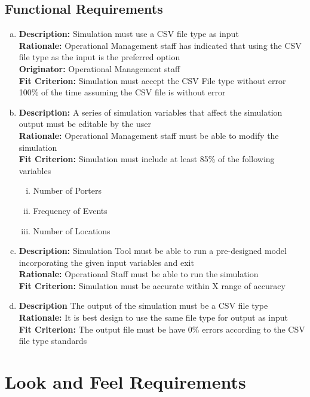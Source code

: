 \documentclass[paper=letter, fontsize=10pt]{scrartcl}
\numberwithin{equation}{section}		%
\numberwithin{figure}{section}			%
\numberwithin{table}{section}				%
\begin{document}
\subsection{Functional Requirements}
\begin{enumerate}[(a)]
	\item \textbf{Description:} Simulation must use a CSV file type as input
	\\ \textbf{Rationale:} Operational Management staff has indicated that using the CSV file type as the input is the preferred option
	\\ \textbf{Originator:} Operational Management staff
	\\ \textbf{Fit Criterion:} Simulation must accept the CSV File type without error 100\% of the time assuming the CSV file is without error
	\item \textbf{Description:} A series of simulation variables that affect the simulation output must be editable by the user
	\\ \textbf{Rationale:} Operational Management staff must be able to modify the simulation
	\\ \textbf{Fit Criterion:} Simulation must include at least 85\% of the following variables   
	\begin{enumerate}[(i)]
		\item Number of Porters
		\item Frequency of Events
		\item Number of Locations
	\end{enumerate}
	\item \textbf{Description:} Simulation Tool must be able to run a pre-designed model incorporating the given input variables and exit
	\\ \textbf{Rationale:} Operational Staff must be able to run the simulation
	\\ \textbf{Fit Criterion:} Simulation must be accurate within X range of accuracy 
	\item \textbf{Description} The output of the simulation must be a CSV file type
	\\ \textbf{Rationale:} It is best design to use the same file type for output as input
	\\ \textbf{Fit Criterion:} The output file must be have 0\% errors according to the CSV file type standards 
\end{enumerate}

\section{Look and Feel Requirements}
\end{document}
